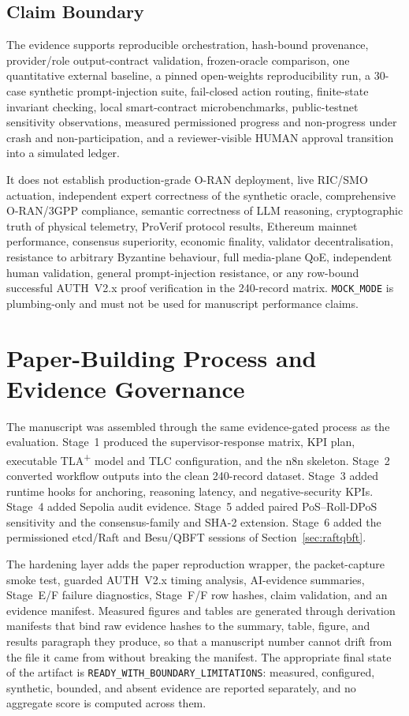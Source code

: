 \documentclass[journal]{IEEEtran}
\begin{document}
\subsection{Claim Boundary}
\label{sec:boundary}
The evidence supports reproducible orchestration, hash-bound provenance,
provider/role output-contract validation, frozen-oracle comparison, one
quantitative external baseline, a pinned open-weights reproducibility run, a
30-case synthetic prompt-injection suite, fail-closed action routing,
finite-state invariant checking, local
smart-contract microbenchmarks, public-testnet sensitivity observations,
measured permissioned progress and non-progress under crash and
non-participation, and a reviewer-visible HUMAN approval transition into a
simulated ledger.

It does not establish production-grade O-RAN deployment, live RIC/SMO
actuation, independent expert correctness of the synthetic oracle,
comprehensive O-RAN/3GPP compliance, semantic correctness of LLM reasoning,
cryptographic truth of physical telemetry, ProVerif protocol results, Ethereum
mainnet performance, consensus superiority, economic finality, validator
decentralisation, resistance to arbitrary Byzantine behaviour, full
media-plane QoE, independent human validation, general prompt-injection
resistance, or any row-bound successful AUTH~V2.x proof verification in the
240-record matrix. \texttt{MOCK\_MODE} is plumbing-only and must not be used
for manuscript performance claims.

\section{Paper-Building Process and Evidence Governance}
\label{sec:paper-building}

The manuscript was assembled through the same evidence-gated process as the
evaluation. Stage~1 produced the supervisor-response matrix, KPI plan,
executable TLA\textsuperscript{+} model and TLC configuration, and the n8n
skeleton. Stage~2 converted workflow outputs into the clean 240-record
dataset. Stage~3 added runtime hooks for anchoring, reasoning latency, and
negative-security KPIs. Stage~4 added Sepolia audit evidence. Stage~5 added
paired PoS--Roll-DPoS sensitivity and the consensus-family and SHA-2
extension. Stage~6 added the permissioned etcd/Raft and Besu/QBFT sessions of
Section~\ref{sec:raftqbft}.

The hardening layer adds the paper reproduction wrapper, the packet-capture
smoke test, guarded AUTH~V2.x timing analysis, AI-evidence summaries,
Stage~E/F failure diagnostics, Stage~F/F row hashes, claim validation, and an
evidence manifest. Measured figures and tables are generated through
derivation manifests that bind raw evidence hashes to the summary, table,
figure, and results paragraph they produce, so that a manuscript number cannot
drift from the file it came from without breaking the manifest. The
appropriate final state of the artifact is
\texttt{READY\_WITH\_BOUNDARY\_LIMITATIONS}: measured, configured, synthetic,
bounded, and absent evidence are reported separately, and no aggregate score
is computed across them.
\end{document}
